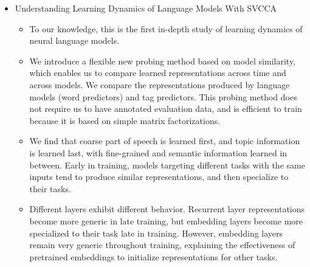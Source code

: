 \begin{itemize}
    \item Understanding Learning Dynamics of Language Models With SVCCA
    \begin{itemize}
        \item To our knowledge, this is the first in-depth study of learning dynamics of neural language models.
        \item We introduce a flexible new probing method based on model similarity, which enables us to compare learned representations across time and across models. We compare the representations produced by language models (word predictors) and tag predictors. This probing method does not require us to have annotated evaluation data, and is efficient to train because it is based on simple matrix factorizations.
        \item We find that coarse part of speech is learned first, and topic information is learned last, with fine-grained and semantic information learned in between. Early in training, models targeting different tasks with the same inputs tend to produce similar representations, and then specialize to their tasks.
        \item Different layers exhibit different behavior. Recurrent layer representations become more generic in late training, but embedding layers become more specialized to their task late in training. However, embedding layers remain very generic throughout training, explaining the effectiveness of pretrained embeddings to initialize representations for other tasks.

\end{itemize}
\end{itemize}
